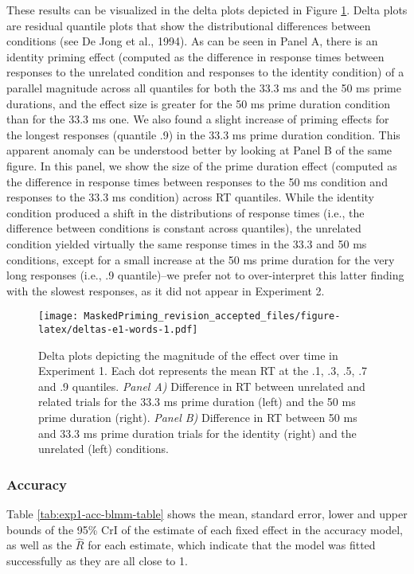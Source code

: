 \documentclass[
  english,
  man,floatsintext]{apa6}
\begin{document}
These results can be visualized in the delta plots depicted in Figure \ref{fig:deltas-e1-words}. Delta plots are residual quantile plots that show the distributional differences between conditions (see De Jong et al., 1994). As can be seen in Panel A, there is an identity priming effect (computed as the difference in response times between responses to the unrelated condition and responses to the identity condition) of a parallel magnitude across all quantiles for both the 33.3 ms and the 50 ms prime durations, and the effect size is greater for the 50 ms prime duration condition than for the 33.3 ms one. We also found a slight increase of priming effects for the longest responses (quantile .9) in the 33.3 ms prime duration condition. This apparent anomaly can be understood better by looking at Panel B of the same figure. In this panel, we show the size of the prime duration effect (computed as the difference in response times between responses to the 50 ms condition and responses to the 33.3 ms condition) across RT quantiles. While the identity condition produced a shift in the distributions of response times (i.e., the difference between conditions is constant across quantiles), the unrelated condition yielded virtually the same response times in the 33.3 and 50 ms conditions, except for a small increase at the 50 ms prime duration for the very long responses (i.e., .9 quantile)--we prefer not to over-interpret this latter finding with the slowest responses, as it did not appear in Experiment 2.

\begin{figure}
\centering
\texttt{[image: MaskedPriming\_revision\_accepted\_files/figure-latex/deltas-e1-words-1.pdf]}
\caption{\label{fig:deltas-e1-words}Delta plots depicting the magnitude of the effect over time in Experiment 1. Each dot represents the mean RT at the .1, .3, .5, .7 and .9 quantiles. \emph{Panel A)} Difference in RT between unrelated and related trials for the 33.3 ms prime duration (left) and the 50 ms prime duration (right). \emph{Panel B)} Difference in RT between 50 ms and 33.3 ms prime duration trials for the identity (right) and the unrelated (left) conditions.}
\end{figure}

\hypertarget{accuracy}{%
\subsubsection{Accuracy}\label{accuracy}}

Table \ref{tab:exp1-acc-blmm-table} shows the mean, standard error, lower and upper bounds of the 95\% CrI of the estimate of each fixed effect in the accuracy model, as well as the \(\hat{R}\) for each estimate, which indicate that the model was fitted successfully as they are all close to 1.
\end{document}
